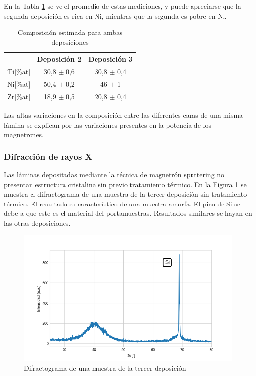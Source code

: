 \documentclass{article}
\theoremstyle{definition}
\theoremstyle{remark}
\begin{document}
En la Tabla \ref{compositionAvg} se ve el promedio de estas mediciones, y puede apreciarse que la segunda deposición es rica en Ni, mientras que la segunda es pobre en Ni.


\begin{table}[H]
\centering
\begin{tabular}{c|c|c|}
\cline{2-3}
\multicolumn{1}{l|}{} & Deposición 2 & Deposición 3 \\ \hline
\multicolumn{1}{|c|}{Ti{[}\%at{]}} & 30,8 $\pm$ 0,6 & 30,8 $\pm$ 0,4 \\ \hline
\multicolumn{1}{|c|}{Ni{[}\%at{]}} & 50,4 $\pm$ 0,2 & 46 $\pm$ 1 \\ \hline
\multicolumn{1}{|c|}{Zr{[}\%at{]}} & 18,9 $\pm$ 0,5 & 20,8 $\pm$ 0,4 \\ \hline
\end{tabular}
\caption{Composición estimada para ambas deposiciones}
\label{compositionAvg}
\end{table}

Las altas variaciones en la composición entre las diferentes caras de una misma lámina se explican por las variaciones presentes en la potencia de los magnetrones. 

\subsubsection{Difracción de rayos X}
Las láminas depositadas mediante la técnica de magnetrón sputtering no presentan estructura cristalina sin previo tratamiento térmico. En la Figura \ref{amorfo} se muestra el difractograma de una muestra de la tercer deposición sin tratamiento térmico. El resultado es característico de una muestra amorfa. El pico de Si se debe a que este es el material del portamuestras. Resultados similares se hayan en las otras deposiciones.

\begin{figure}[H]
 	\centering
	\includegraphics[scale=0.6]{img/RX_amorfo.png}
 	\caption{Difractograma de una muestra de la tercer deposición}
	\label{amorfo}
\end{figure}
\end{document}
